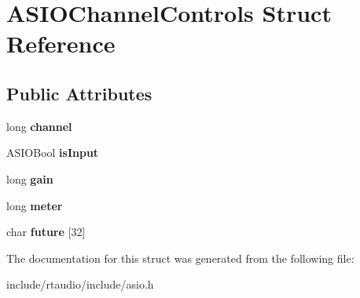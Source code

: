 \hypertarget{struct_a_s_i_o_channel_controls}{}\section{A\+S\+I\+O\+Channel\+Controls Struct Reference}
\label{struct_a_s_i_o_channel_controls}
\subsection*{Public Attributes}
\begin{DoxyCompactItemize}
\item 
long {\bfseries channel}\hypertarget{struct_a_s_i_o_channel_controls_ad1b5fba80a9bc9bfb69d70a6488cc3d2}{}\label{struct_a_s_i_o_channel_controls_ad1b5fba80a9bc9bfb69d70a6488cc3d2}

\item 
A\+S\+I\+O\+Bool {\bfseries is\+Input}\hypertarget{struct_a_s_i_o_channel_controls_abcdf7e444e418e43640520c11541a12c}{}\label{struct_a_s_i_o_channel_controls_abcdf7e444e418e43640520c11541a12c}

\item 
long {\bfseries gain}\hypertarget{struct_a_s_i_o_channel_controls_a89cea9b9e640c7f003decf191e8720d7}{}\label{struct_a_s_i_o_channel_controls_a89cea9b9e640c7f003decf191e8720d7}

\item 
long {\bfseries meter}\hypertarget{struct_a_s_i_o_channel_controls_ae7898d9b9627615e39e6ad1775dc63a7}{}\label{struct_a_s_i_o_channel_controls_ae7898d9b9627615e39e6ad1775dc63a7}

\item 
char {\bfseries future} \mbox{[}32\mbox{]}\hypertarget{struct_a_s_i_o_channel_controls_a939bedddd0e7e848d06f39f0a90327ac}{}\label{struct_a_s_i_o_channel_controls_a939bedddd0e7e848d06f39f0a90327ac}

\end{DoxyCompactItemize}


The documentation for this struct was generated from the following file\+:\begin{DoxyCompactItemize}
\item 
include/rtaudio/include/asio.\+h\end{DoxyCompactItemize}
